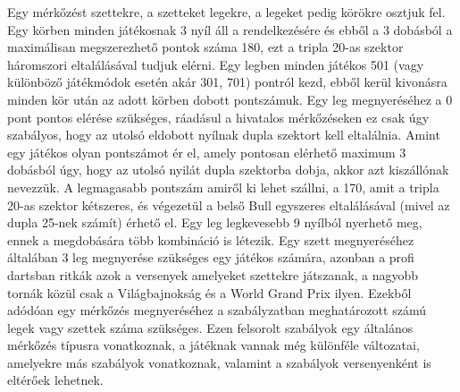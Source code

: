 Egy mérkőzést szettekre, a szetteket legekre, a legeket pedig körökre osztjuk fel. Egy körben minden játékosnak 3 nyíl áll a rendelkezésére és ebből a 3 dobásból a maximálisan megszerezhető pontok száma 180, ezt a tripla 20-as szektor háromszori eltalálásával tudjuk elérni. Egy legben minden játékos 501 (vagy különböző játékmódok esetén akár 301, 701) pontról kezd, ebből kerül kivonásra minden kör után az adott körben dobott pontszámuk. Egy leg megnyeréséhez a 0 pont pontos elérése szükséges, ráadásul a hivatalos mérkőzéseken ez csak úgy szabályos, hogy az utolsó eldobott nyílnak dupla szektort kell eltalálnia. Amint egy játékos olyan pontszámot ér el, amely pontosan elérhető maximum 3 dobásból úgy, hogy az utolsó nyilát dupla szektorba dobja, akkor azt kiszállónak nevezzük. A legmagasabb pontszám amiről ki lehet szállni, a 170, amit a tripla 20-as szektor kétszeres, és végezetül a belső Bull egyszeres eltalálásával (mivel az dupla 25-nek számít) érhető el. Egy leg legkevesebb 9 nyílból nyerhető meg, ennek a megdobására több kombináció is létezik. Egy szett megnyeréséhez általában 3 leg megnyerése szükséges egy játékos számára, azonban a profi dartsban ritkák azok a versenyek amelyeket szettekre játszanak, a nagyobb tornák közül csak a Világbajnokság és a World Grand Prix ilyen. Ezekből adódóan egy mérkőzés megnyeréséhez a szabályzatban meghatározott számú legek vagy szettek száma szükséges. Ezen felsorolt szabályok egy általános mérkőzés típusra vonatkoznak, a játéknak vannak még különféle változatai, amelyekre más szabályok vonatkoznak, valamint a szabályok versenyenként is eltérőek lehetnek.



